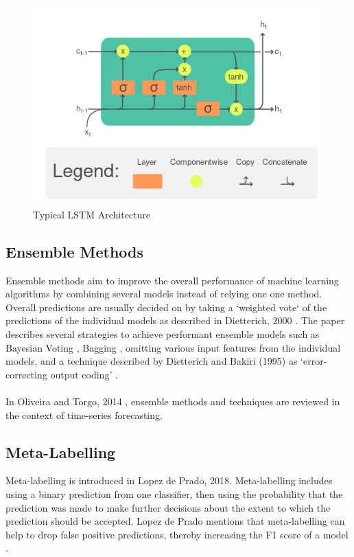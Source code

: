 \begin{figure}[h]
    \centering
    \includegraphics[scale=0.5]{background/LSTM_Cell.png}
    \caption{Typical LSTM Architecture}
    \label{fig:my_label}
\end{figure}

\subsection{Ensemble Methods}
Ensemble methods aim to improve the overall performance of machine learning algorithms by combining several models instead of relying one one method. Overall predictions are usually decided on by taking a `weighted vote` of the predictions of the individual models as described in Dietterich, 2000 \cite{dietterich2000ensemble}. The paper describes several strategies to achieve performant ensemble models such as Bayesian Voting \cite{dietterich2000ensemble}, Bagging \cite{bootstrap},  omitting various input features from the individual models, and a technique described by Dietterich and Bakiri (1995) as `error-correcting output coding' \cite{dietterich1994solving}. \\ \\
In Oliveira and Torgo, 2014 \cite{acml2014}, ensemble methods and techniques are reviewed in the context of time-series forecasting. 
 
\subsection{Meta-Labelling}
Meta-labelling is introduced in Lopez de Prado, 2018. Meta-labelling includes using a binary prediction from one classifier, then using the probability that the prediction was made to make further decisions about the extent to which the prediction should be accepted. Lopez de Prado mentions that meta-labelling can help to drop false positive predictions, thereby increasing the F1 score of a model \cite{marcos}.

